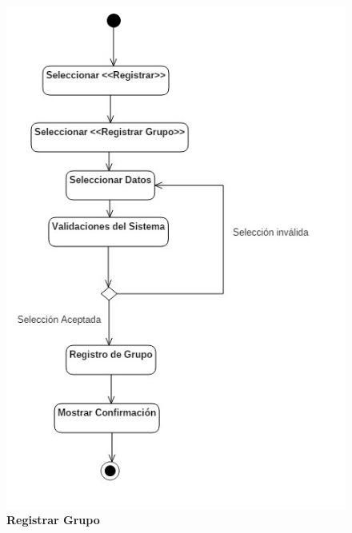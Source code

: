 \begin{figure}[H]
  \centering
    \includegraphics[scale=.8,angle=0]{project/Actividades/grupo.jpg}
  \caption{\textbf{Registrar Grupo}}
\end{figure}
